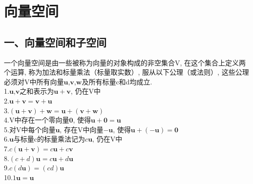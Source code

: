 \chapter{向量空间}
\section{一、向量空间和子空间}
\begin{definition}
一个向量空间是由一些被称为向量的对象构成的非空集合V, 在这个集合上定义两个运算, 称为加法和标量乘法（标量取实数）, 服从以下公理（或法则）, 这些公理必须对V中所有向量$\mathbf{u}$,$\mathbf{v}$,$\mathbf{w}$及所有标量c和d均成立.\\
1.\quad$\mathbf{u}$,$\mathbf{v}$之和表示为$\mathbf{u}+\mathbf{v}$, 仍在V中\\
2.\quad$\mathbf{u+v=v+u}$\\
3.\quad$\mathbf{(u+v)+w=u+(v+w)}$\\
4.\quad V中存在一个零向量$\mathbf{0}$, 使得$\mathbf{u+0=u}$\\
5.\quad 对V中每个向量$\mathbf{u}$, 存在V中向量$-\mathbf{u}$, 使得$\mathbf{u+(-u)=0}$\\
6.\quad$\mathbf{u}$与标量c的标量乘法记为$c\mathbf{u}$, 仍在V中\\
7.\quad$c\mathbf{(u+v)}=c\mathbf{u}+c\mathbf{v}$\\
8.\quad$(c+d)\mathbf{u}=c\mathbf{u}+d\mathbf{u}$\\
9.\quad$c(d\mathbf{u})=(cd)\mathbf{u}$\\
10.\quad$1\mathbf{u=u}$\\
\end{definition}
